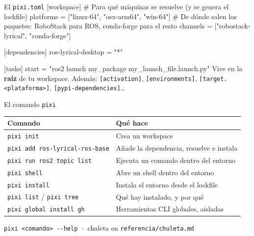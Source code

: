 \documentclass[aspectratio=169]{beamer}
\newcommand{\referencia}[1]{\vfill{\scriptsize\color{halfgray} #1}}
\begin{document}
\begin{frame}[fragile]{El \texttt{pixi.toml}}
[workspace]
# Para qué máquinas se resuelve (y se genera el lockfile)
platforms = ["linux-64", "osx-arm64", "win-64"]
# De dónde salen los paquetes: RoboStack para ROS, conda-forge para el resto
channels = ["robostack-lyrical", "conda-forge"]

[dependencies]
ros-lyrical-desktop = "*"

[tasks]
start = "ros2 launch my_package my_launch_file.launch.py"
\vfill
Vive en la \textbf{raíz} de tu workspace. Además: \lstinline|[activation]|, \lstinline|[environments]|, \lstinline|[target.<plataforma>]|, \lstinline|[pypi-dependencies]|\ldots
\end{frame}

\begin{frame}{El comando \texttt{pixi}}
\centering
\begin{tabular}{ll}
\toprule
\textbf{Comando} & \textbf{Qué hace} \\
\midrule
\lstinline|pixi init| & Crea un workspace \\
\lstinline|pixi add ros-lyrical-ros-base| & Añade la dependencia, resuelve e instala \\
\lstinline|pixi run ros2 topic list| & Ejecuta un comando dentro del entorno \\
\lstinline|pixi shell| & Abre un shell dentro del entorno \\
\lstinline|pixi install| & Instala el entorno desde el lockfile \\
\lstinline|pixi list| / \lstinline|pixi tree| & Qué hay instalado, y por qué \\
\lstinline|pixi global install gh| & Herramientas CLI globales, aisladas \\
\bottomrule
\end{tabular}
\referencia{\lstinline|pixi <comando> --help| · chuleta en \texttt{referencia/chuleta.md}}
\end{frame}
\end{document}
